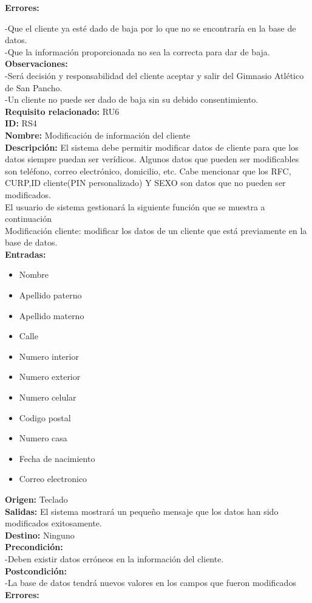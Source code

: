 \textbf{Errores: }

-Que el cliente ya esté dado de baja por lo que no se encontraría en la base de datos.\\
-Que la información proporcionada no sea la correcta para dar de baja.\\
\textbf{Observaciones: }\\

-Será decisión y responsabilidad del cliente aceptar y salir del Gimnasio Atlético de San Pancho.\\
-Un cliente no puede ser dado de baja sin su debido consentimiento.\\
     \textbf{Requisito relacionado:} RU6\\

\textbf{ID:} RS4\\
\textbf{Nombre:} Modificación de información del cliente \\
\textbf{Descripción:} El sistema debe permitir modificar datos de cliente para que los datos siempre puedan ser verídicos. Algunos datos que pueden ser modificables son teléfono, correo electrónico, domicilio, etc. Cabe mencionar que los RFC, CURP,ID cliente(PIN personalizado)  Y SEXO son datos que no pueden ser modificados.\\
El usuario de sistema gestionará la siguiente función que se muestra a continuación\\
   Modificación cliente: modificar los datos de un cliente que está previamente en la base de datos.\\

\textbf{Entradas: }
	\begin{itemize}
		\item Nombre
		\item Apellido paterno 
		\item Apellido materno
		\item Calle
		\item Numero interior
		\item Numero exterior
		\item Numero celular
		\item Codigo postal
		\item Numero casa
		\item Fecha de nacimiento
		\item Correo electronico
	\end{itemize}
\textbf{Origen:} Teclado\\
\textbf{Salidas:} El sistema mostrará un pequeño mensaje que los datos han sido modificados exitosamente.\\
\textbf{Destino:} Ninguno\\
\textbf{Precondición: }\\
-Deben existir datos erróneos en la información del cliente.\\
\textbf{Postcondición:}\\
-La base de datos tendrá nuevos valores en los campos que fueron modificados\\
\textbf{Errores: }\\

